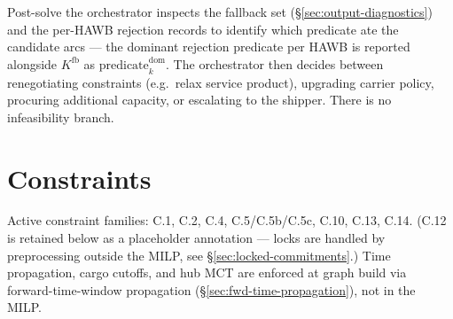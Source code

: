\documentclass[11pt,a4paper]{article}
\theoremstyle{definition}
\begin{document}
Post-solve the orchestrator inspects the fallback set
(\S\ref{sec:output-diagnostics}) and the per-HAWB rejection records to
identify which predicate ate the candidate arcs --- the dominant rejection
predicate per HAWB is reported alongside $K^{\text{fb}}$ as
$\text{predicate}^{\text{dom}}_k$. The orchestrator then decides between
renegotiating constraints (e.g.\ relax service product), upgrading carrier
policy, procuring additional capacity, or escalating to the shipper.
There is no infeasibility branch.

\section{Constraints}
\label{sec:constraints}

Active constraint families: C.1, C.2, C.4, C.5/C.5b/C.5c, C.10, C.13,
C.14. (C.12 is retained below as a placeholder annotation --- locks are
handled by preprocessing outside the MILP, see
\S\ref{sec:locked-commitments}.) Time propagation, cargo cutoffs, and
hub MCT are enforced at graph build via forward-time-window propagation
(\S\ref{sec:fwd-time-propagation}), not in the MILP.
\end{document}

